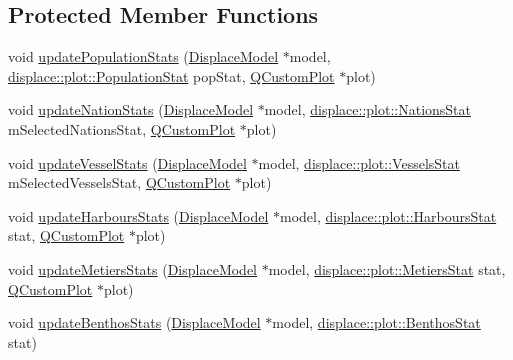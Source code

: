 \subsection*{Protected Member Functions}
\begin{DoxyCompactItemize}
\item 
void \mbox{\hyperlink{class_stats_controller_a9d511629c1e94339c39d23fe4d24746a}{update\+Population\+Stats}} (\mbox{\hyperlink{class_displace_model}{Displace\+Model}} $\ast$model, \mbox{\hyperlink{namespacedisplace_1_1plot_a523612c6239ff69acc3e5b7c5b40b618}{displace\+::plot\+::\+Population\+Stat}} pop\+Stat, \mbox{\hyperlink{class_q_custom_plot}{Q\+Custom\+Plot}} $\ast$plot)
\item 
void \mbox{\hyperlink{class_stats_controller_a180c3597c4cc31173c118e30be485072}{update\+Nation\+Stats}} (\mbox{\hyperlink{class_displace_model}{Displace\+Model}} $\ast$model, \mbox{\hyperlink{namespacedisplace_1_1plot_ab7b96ae3ae291a71823f371d77f27d98}{displace\+::plot\+::\+Nations\+Stat}} m\+Selected\+Nations\+Stat, \mbox{\hyperlink{class_q_custom_plot}{Q\+Custom\+Plot}} $\ast$plot)
\item 
void \mbox{\hyperlink{class_stats_controller_a0e5383657cec689a8e657a9115765c17}{update\+Vessel\+Stats}} (\mbox{\hyperlink{class_displace_model}{Displace\+Model}} $\ast$model, \mbox{\hyperlink{namespacedisplace_1_1plot_aa453098d286017edd5b0ff3f15ba1013}{displace\+::plot\+::\+Vessels\+Stat}} m\+Selected\+Vessels\+Stat, \mbox{\hyperlink{class_q_custom_plot}{Q\+Custom\+Plot}} $\ast$plot)
\item 
void \mbox{\hyperlink{class_stats_controller_a9a74daa06e526a0153e1c724ac50039b}{update\+Harbours\+Stats}} (\mbox{\hyperlink{class_displace_model}{Displace\+Model}} $\ast$model, \mbox{\hyperlink{namespacedisplace_1_1plot_a006fcde9bb7e602d977226ff75cb67aa}{displace\+::plot\+::\+Harbours\+Stat}} stat, \mbox{\hyperlink{class_q_custom_plot}{Q\+Custom\+Plot}} $\ast$plot)
\item 
void \mbox{\hyperlink{class_stats_controller_ae34808c08e1ad8834ec34329f7fa77c5}{update\+Metiers\+Stats}} (\mbox{\hyperlink{class_displace_model}{Displace\+Model}} $\ast$model, \mbox{\hyperlink{namespacedisplace_1_1plot_a673bbc813b7f03be3dc76ae7fd087516}{displace\+::plot\+::\+Metiers\+Stat}} stat, \mbox{\hyperlink{class_q_custom_plot}{Q\+Custom\+Plot}} $\ast$plot)
\item 
void \mbox{\hyperlink{class_stats_controller_ab43599a0bbe242b5e4bc4bc3edaeaf58}{update\+Benthos\+Stats}} (\mbox{\hyperlink{class_displace_model}{Displace\+Model}} $\ast$model, \mbox{\hyperlink{namespacedisplace_1_1plot_a3a91ceda6f3e5855d0e7cf97e8dea045}{displace\+::plot\+::\+Benthos\+Stat}} stat)

\end{DoxyCompactItemize}
